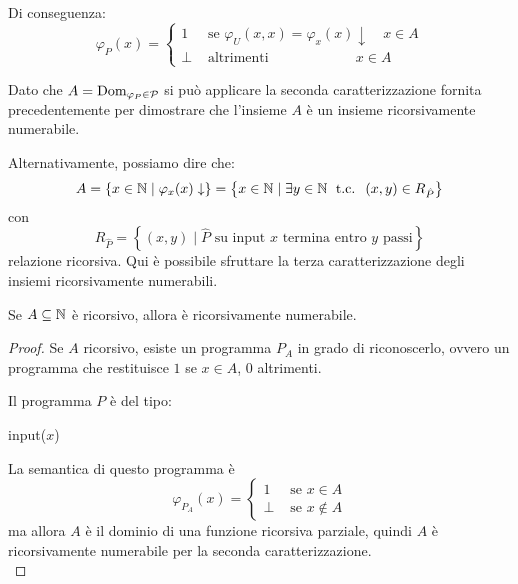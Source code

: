 Di conseguenza:
$$
\varphi_P (x) = \begin{cases}
	1 & \text{ se } \varphi_U (x,x) = \varphi_x (x) \downarrow \quad x \in A \\
	\bot & \text{ altrimenti} \quad\quad\quad\quad\quad\quad \ x \in A
\end{cases}
$$

Dato che $A = \text{Dom}_{\varphi_P \in \mathcal{P}}$ si può applicare la seconda caratterizzazione fornita precedentemente per dimostrare che l'insieme $A$ è un insieme ricorsivamente numerabile.

Alternativamente, possiamo dire che:
$$ A = \left\{x \in \mathbb{N} \mid \varphi_x (x) \downarrow \right\} = \left\{x \in \mathbb{N} \mid \exists y \in \mathbb{N} \; \text{ t.c. } \; (x,y) \in R_{\hat{P}}\right\} $$
con
$$
R_{\hat{P}} = \left\{(x,y) \mid \hat{P} \text{ su input } x \text{ termina entro } y \text{ passi}\right\}
$$
relazione ricorsiva. Qui è possibile sfruttare la terza caratterizzazione degli insiemi ricorsivamente numerabili. \\

\begin{theor}
	Se $A \subseteq \mathbb{N}$ è ricorsivo, allora è ricorsivamente numerabile.
\end{theor}
\begin{proof}
	Se $A$ ricorsivo, esiste un programma $P_{A}$ in grado di riconoscerlo, ovvero un programma che restituisce $1$ se $x \in A$, $0$ altrimenti.

	Il programma $P$ è del tipo:
	\begin{center}
		\begin{minipage}{.4\textwidth}
			\begin{tcolorbox}[
				colback=white,
				sharp corners,
				boxrule=.3mm,
				left=20pt,
				top=0pt,
				bottom=0pt,
				title=$P$,
				colbacktitle=white,
				coltitle=black
				]
				\begin{algorithm}[H]
					\SetAlgoNoEnd
					input($x$) \\
					 
				\end{algorithm}
			\end{tcolorbox}
		\end{minipage}
	\end{center}

	La semantica di questo programma è
	$$ \varphi_{P_A} (x) = \begin{cases}
		1 & \text{ se } x \in A\\
		\bot & \text{ se } x \notin A
	\end{cases}$$
	ma allora $A$ è il dominio di una funzione ricorsiva parziale, quindi $A$ è ricorsivamente numerabile per la seconda caratterizzazione.\\
\end{proof}


